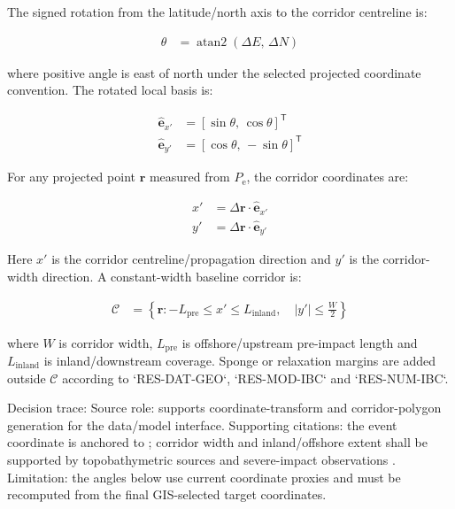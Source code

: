 The signed rotation from the latitude/north axis to the corridor
centreline is:

\begin{align}
  \theta
  &=
  \operatorname{atan2}
  \left(
    \Delta E,\,
    \Delta N
  \right)
  \label{eq:res-dat-scn-corridor-bearing-angle}
\end{align}

where positive angle is east of north under the selected projected
coordinate convention. The rotated local basis is:

\begin{align}
  \hat{\mathbf{e}}_{x'}
  &=
  \left[
    \sin\theta,\,
    \cos\theta
  \right]^{\mathsf{T}}
  \label{eq:res-dat-scn-corridor-centreline-basis}
  \\
  \hat{\mathbf{e}}_{y'}
  &=
  \left[
    \cos\theta,\,
    -\sin\theta
  \right]^{\mathsf{T}}
  \label{eq:res-dat-scn-corridor-width-basis}
\end{align}

For any projected point $\mathbf{r}$ measured from $P_{\mathrm{e}}$,
the corridor coordinates are:

\begin{align}
  x'
  &=
  \Delta\mathbf{r}
  \cdot
  \hat{\mathbf{e}}_{x'}
  \label{eq:res-dat-scn-corridor-x-prime}
  \\
  y'
  &=
  \Delta\mathbf{r}
  \cdot
  \hat{\mathbf{e}}_{y'}
  \label{eq:res-dat-scn-corridor-y-prime}
\end{align}

Here $x'$ is the corridor centreline/propagation direction and $y'$ is
the corridor-width direction. A constant-width baseline corridor is:

\begin{align}
  \mathcal{C}
  &=
  \left\{
    \mathbf{r}:
    -L_{\mathrm{pre}}
    \leq
    x'
    \leq
    L_{\mathrm{inland}},
    \quad
    \left|y'\right|
    \leq
    \frac{W}{2}
  \right\}
  \label{eq:res-dat-scn-constant-width-corridor}
\end{align}

where $W$ is corridor width, $L_{\mathrm{pre}}$ is offshore/upstream
pre-impact length and $L_{\mathrm{inland}}$ is inland/downstream
coverage. Sponge or relaxation margins are added outside
$\mathcal{C}$ according to `RES-DAT-GEO`, `RES-MOD-IBC` and
`RES-NUM-IBC`.

Decision trace: Source role: supports coordinate-transform and
corridor-polygon generation for the data/model interface. Supporting
citations: the event coordinate is anchored to
\textcite{usgs2011tohokuEvent}; corridor width and inland/offshore
extent shall be supported by topobathymetric sources
\parencite{jodcJegg500,gsiDemDownload,gebco2026grid} and severe-impact
observations \parencite{mori2012nationwide,noaaNceiHistoricalTsunami}.
Limitation: the angles below use current coordinate proxies and must be
recomputed from the final GIS-selected target coordinates.

